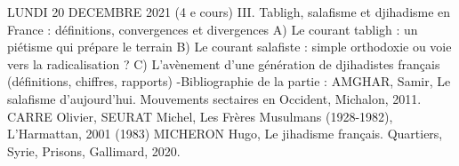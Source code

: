 LUNDI 20 DECEMBRE 2021 (4
e
cours)
III. Tabligh, salafisme et djihadisme en France : définitions, convergences et
divergences
A) Le courant tabligh : un piétisme qui prépare le terrain
B) Le courant salafiste : simple orthodoxie ou voie vers la radicalisation ?
C) L’avènement d’une génération de djihadistes français (définitions, chiffres,
rapports)
-Bibliographie de la partie :
AMGHAR, Samir, Le salafisme d’aujourd’hui. Mouvements sectaires en Occident,
Michalon, 2011.
CARRE Olivier, SEURAT Michel, Les Frères Musulmans (1928-1982), L'Harmattan,
2001 (1983)
MICHERON Hugo, Le jihadisme français. Quartiers, Syrie, Prisons, Gallimard, 2020.